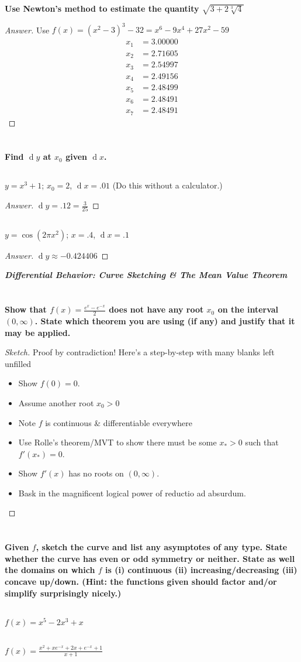 \documentclass[english]{article}
\renewcommand{\d}[1]{\ensuremath{\operatorname{d}\!{#1}}}
\newcommand{\prob}[1]{\setcounter{section}{#1-1}\section{}}
\newcommand{\prt}[1]{\setcounter{subsection}{#1-1}\subsection{}}
\theoremstyle{remark}
\theoremstyle{definition}
\newcommand{\ild}[1]{\displaystyle{#1}}
\begin{document}
		\prob{6} \textbf{Use Newton's method to estimate the quantity $\sqrt{3+2\sqrt[3]{4}}$}
		\begin{proof}[Answer]
			Use $f(x)=(x^2 - 3)^3 - 32=x^6-9 x^4+27 x^2-59$\begin{align*}
				x_1&=3.00000\\x_2&= 2.71605\\x_3&= 2.54997\\x_4&= 2.49156\\x_5&= 2.48499\\x_6&= 2.48491\\x_7&= 2.48491
			\end{align*}
		\end{proof}
		\prob{7} \textbf{Find $\d y$ at $x_0$ given $\d x$.}
		\prt{1} $y=x^3+1$; $x_0=2$, $\d x=.01$ (Do this without a calculator.)
		\begin{proof}[Answer]
			$\d y=.12=\frac{3}{25}$
			\end{proof}
		\prt{2} $y=\cos{(2\pi x^2)}$; $x=.4$, $\d x=.1$\begin{proof}[Answer]
			$\d y \approx -0.424406$
		\end{proof}
		\begin{center}
			{\Large\textbf{\emph{Differential Behavior: Curve Sketching \& The Mean Value Theorem}}}\end{center}
			\prob{8} \textbf{Show that $f(x)=\frac{e^x-e^{-x}}{2}$ does not have any root $x_0$ on the interval $(0,\infty)$. State which theorem you are using (if any) and justify that it may be applied.}
			\begin{proof}[Sketch]
				Proof by contradiction! Here's a step-by-step with many blanks left unfilled \begin{itemize}
				\item Show $f(0)=0$.
				\item Assume another root $x_0>0$
				\item Note $f$ is continuous \& differentiable everywhere
				\item Use Rolle's theorem/MVT to show there must be some $x_*>0$ such that $f'(x_*)=0$.
				\item Show $f'(x)$ has no roots on $(0,\infty)$.
				\item Bask in the magnificent logical power of reductio ad absurdum.
				\end{itemize}
			\end{proof}
			\prob{9}\textbf{Given $f$, sketch the curve and list any asymptotes of any type. State whether the curve has even or odd symmetry or neither. State as well the domains on which $f$ is (i) continuous (ii) increasing/decreasing (iii) concave up/down. (Hint: the functions given should factor and/or simplify surprisingly nicely.)}\prt{1}
			$\ild{f(x)=x^5-2x^3+x}$ 
			\prt{2} $\ild{f(x)=\frac{x^2+xe^{-x}+2x+e^{-x}+1}{x+1}}$\newpage
			
\end{document}
